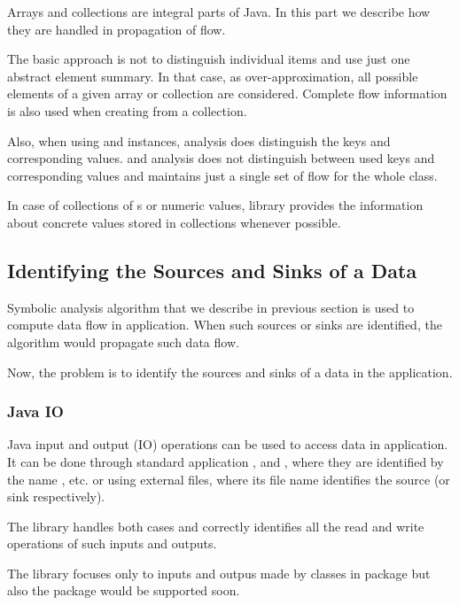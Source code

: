 Arrays and collections are integral parts of Java. In this part we describe how
they are handled in propagation of flow.

The basic approach is not to distinguish individual items and use just one
abstract element summary. In that case, as over-approximation, all possible elements
of a given array or collection are considered.
Complete flow information is also used when creating 
from a collection.

Also, when using  and  instances,
analysis does distinguish the keys and corresponding values.
and 
analysis does not distinguish between used keys and corresponding values
and maintains just a single set of flow for the whole class.

In case of collections of s or numeric values, library provides
the information about concrete values stored in collections whenever possible.





\subsection{Identifying the Sources and Sinks of a Data}

Symbolic analysis algorithm that we describe in previous section is
used to compute data flow in application.
When such sources or sinks are identified, the algorithm would
propagate such data flow.

Now, the problem is to identify the sources and sinks of a data
in the application.




\subsubsection{Java IO}

Java input and output (IO) operations can be used to access data in application.
It can be done through standard application
,  and ,
where they are identified by the name , etc.
or using external files, where its file name identifies the source (or sink respectively).

The library handles both cases and correctly identifies
all the read and write operations of such inputs and outputs.

The library focuses only to inputs and outpus made by classes in  package
but also the  package would be supported soon.




